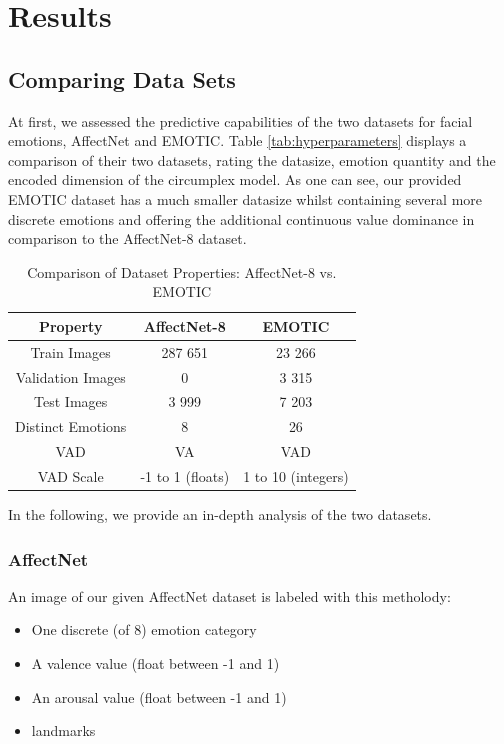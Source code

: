 \documentclass[conference]{IEEEtran}
\begin{document}
\section{Results}


\subsection{Comparing Data Sets}
At first, we assessed the predictive capabilities of the two datasets for facial emotions, AffectNet and EMOTIC. Table \ref{tab:hyperparameters} displays a comparison of their two datasets, rating the datasize, emotion quantity and the encoded dimension of the circumplex model. As one can see, our provided EMOTIC dataset has a much smaller datasize whilst containing several more discrete emotions and offering the additional continuous value dominance in comparison to the AffectNet-8 dataset.

\begin{table}[htbp]
\centering
\begin{tabular}{ c | c c }
 \textbf{Property} & \textbf{AffectNet-8} & \textbf{EMOTIC} \\ 
\hline
 Train Images & 287 651 & 23 266 \\
 Validation Images & 0 & 3 315 \\
 Test Images & 3 999 & 7 203 \\
 Distinct Emotions & 8 & 26 \\
 VAD & VA & VAD \\
 VAD Scale & -1 to 1 (floats) & 1 to 10 (integers) \\
\end{tabular}
\caption{Comparison of Dataset Properties: AffectNet-8 vs. EMOTIC}
\label{tab:dataset_properties}
\end{table}

In the following, we provide an in-depth analysis of the two datasets.

\subsubsection{AffectNet}

An image of our given AffectNet dataset is labeled with this metholody: 
\begin{itemize}
    \item One discrete (of 8) emotion category
    \item A valence value (float between -1 and 1)
    \item An arousal value (float between -1 and 1)
    \item landmarks
\end{itemize}
\end{document}
